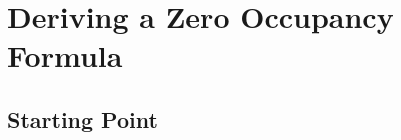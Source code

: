 \documentclass[
	english,
	a4paper,
	fontsize=10pt,
	parskip=half,
	titlepage=true,
	DIV=12,
	final
]{scrreprt}
\title{\myTitle}
\author{\myName}
\date{\today}
\begin{document}
\tableofcontents
\newpage

\chapter{Deriving a Zero Occupancy Formula}
\section{Starting Point}
\end{document}
